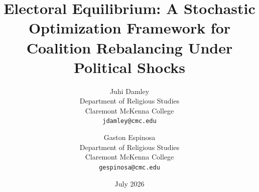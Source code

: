 \documentclass[12pt, letterpaper]{article}
\theoremstyle{definition}
\begin{document}
\title{Electoral Equilibrium: A Stochastic Optimization Framework
       for Coalition Rebalancing Under Political Shocks}

\author{
  Juhi Damley \\
  Department of Religious Studies \\
  Claremont McKenna College \\
  \texttt{jdamley@cmc.edu}
  \and
  Gaston Espinosa \\
  Department of Religious Studies  \\
  Claremont McKenna College \\
  \texttt{gespinosa@cmc.edu}
}

\date{July 2026}

\maketitle
\end{document}
